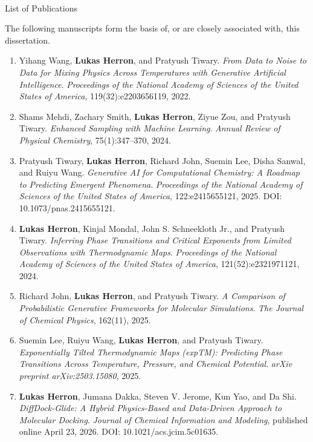 {\singlespacing
\hbox{\ }
\vspace{0.5in}

\begin{center}
\large{List of Publications}
\end{center}

\vspace{3pt}

The following manuscripts form the basis of, or are closely associated with, this dissertation.

\begin{enumerate}
\item Yihang Wang, \textbf{Lukas Herron}, and Pratyush Tiwary. \textit{From Data to Noise to Data for Mixing Physics Across Temperatures with Generative Artificial Intelligence}. \textit{Proceedings of the National Academy of Sciences of the United States of America}, 119(32):e2203656119, 2022.
\item Shams Mehdi, Zachary Smith, \textbf{Lukas Herron}, Ziyue Zou, and Pratyush Tiwary. \textit{Enhanced Sampling with Machine Learning}. \textit{Annual Review of Physical Chemistry}, 75(1):347--370, 2024.
\item Pratyush Tiwary, \textbf{Lukas Herron}, Richard John, Suemin Lee, Disha Sanwal, and Ruiyu Wang. \textit{Generative AI for Computational Chemistry: A Roadmap to Predicting Emergent Phenomena}. \textit{Proceedings of the National Academy of Sciences of the United States of America}, 122:e2415655121, 2025. DOI: 10.1073/pnas.2415655121.
\item \textbf{Lukas Herron}, Kinjal Mondal, John S. Schneekloth Jr., and Pratyush Tiwary. \textit{Inferring Phase Transitions and Critical Exponents from Limited Observations with Thermodynamic Maps}. \textit{Proceedings of the National Academy of Sciences of the United States of America}, 121(52):e2321971121, 2024.
\item Richard John, \textbf{Lukas Herron}, and Pratyush Tiwary. \textit{A Comparison of Probabilistic Generative Frameworks for Molecular Simulations}. \textit{The Journal of Chemical Physics}, 162(11), 2025.
\item Suemin Lee, Ruiyu Wang, \textbf{Lukas Herron}, and Pratyush Tiwary. \textit{Exponentially Tilted Thermodynamic Maps (expTM): Predicting Phase Transitions Across Temperature, Pressure, and Chemical Potential}. \textit{arXiv preprint arXiv:2503.15080}, 2025.
\item \textbf{Lukas Herron}, Jumana Dakka, Steven V. Jerome, Kun Yao, and Da Shi. \textit{DiffDock-Glide: A Hybrid Physics-Based and Data-Driven Approach to Molecular Docking}. \textit{Journal of Chemical Information and Modeling}, published online April 23, 2026. DOI: 10.1021/acs.jcim.5c01635.

\end{enumerate}}
